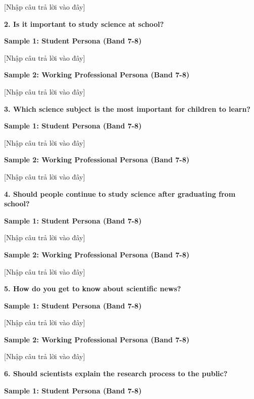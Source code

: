 [Nhập câu trả lời vào đây]

\separator

\begin{ieltsquestion}
\textbf{2. Is it important to study science at school?}
\end{ieltsquestion}
\textbf{Sample 1: Student Persona (Band 7-8)}

[Nhập câu trả lời vào đây]

\textbf{Sample 2: Working Professional Persona (Band 7-8)}

[Nhập câu trả lời vào đây]

\separator

\begin{ieltsquestion}
\textbf{3. Which science subject is the most important for children to learn?}
\end{ieltsquestion}
\textbf{Sample 1: Student Persona (Band 7-8)}

[Nhập câu trả lời vào đây]

\textbf{Sample 2: Working Professional Persona (Band 7-8)}

[Nhập câu trả lời vào đây]

\separator

\begin{ieltsquestion}
\textbf{4. Should people continue to study science after graduating from school?}
\end{ieltsquestion}
\textbf{Sample 1: Student Persona (Band 7-8)}

[Nhập câu trả lời vào đây]

\textbf{Sample 2: Working Professional Persona (Band 7-8)}

[Nhập câu trả lời vào đây]

\separator

\begin{ieltsquestion}
\textbf{5. How do you get to know about scientific news?}
\end{ieltsquestion}
\textbf{Sample 1: Student Persona (Band 7-8)}

[Nhập câu trả lời vào đây]

\textbf{Sample 2: Working Professional Persona (Band 7-8)}

[Nhập câu trả lời vào đây]

\separator

\begin{ieltsquestion}
\textbf{6. Should scientists explain the research process to the public?}
\end{ieltsquestion}
\textbf{Sample 1: Student Persona (Band 7-8)}

